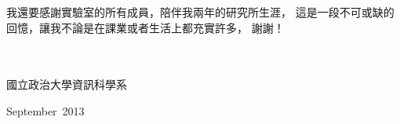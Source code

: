 \begin{acknowledgementsCH}

\setlength{\baselineskip}{1.5em}
我還要感謝實驗室的所有成員，陪伴我兩年的研究所生涯，%
這是一段不可或缺的回憶，讓我不論是在課業或者生活上都充實許多，%
謝謝！
\\
\\
\\


\raggedright{國立政治大學資訊科學系}

\raggedright{September\ 2013}

\end{acknowledgementsCH}
